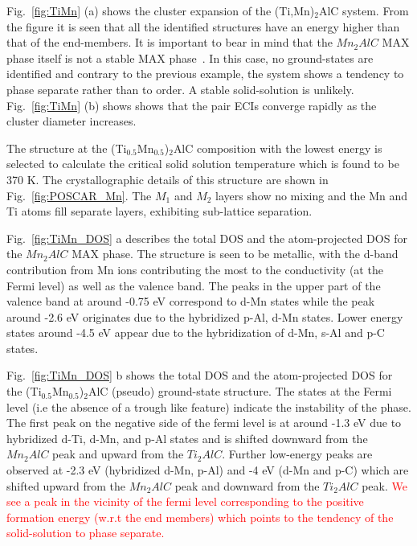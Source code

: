 \documentclass[preprint,amsmath,amssymb,aps, prb,showkeys]{revtex4-1}
\newcommand{\fig}[1]{Fig.~\ref{#1}}
\begin{document}
\fig{fig:TiMn} (a) shows the cluster expansion of the (Ti,Mn)$_2$AlC system. From the figure it is seen that all the identified structures have an energy higher than that of the end-members. It is important to bear in mind that the $Mn_2AlC$ MAX phase itself is not a stable MAX phase~\cite{mockute2013synthesis}. In this case, no ground-states are identified and contrary to the previous example, the system shows a tendency to phase separate rather than to order. A stable solid-solution is unlikely. \fig{fig:TiMn} (b) shows shows that the pair ECIs converge rapidly as the cluster diameter increases. 

The structure at the (Ti$_{0.5}$Mn$_{0.5}$)$_2$AlC composition with the lowest energy is selected to calculate the critical solid solution temperature which is found to be 370 K. The crystallographic details of this structure are shown in \fig{fig:POSCAR_Mn}. The $M_1$ and $M_2$ layers show no mixing and the Mn and Ti atoms fill separate layers, exhibiting sub-lattice separation. 

\fig{fig:TiMn_DOS} a describes the total DOS and the atom-projected  DOS  for the $Mn_2AlC$ MAX phase. The structure is seen to be metallic, with the d-band contribution from Mn ions contributing the most to the conductivity (at the Fermi level) as well as the valence band. The peaks in the upper part of the valence band at around -0.75 eV correspond to d-Mn states while the peak around -2.6 eV originates due to the hybridized p-Al, d-Mn states. Lower energy states around -4.5 eV appear due to the hybridization of d-Mn, s-Al and p-C states. 

\fig{fig:TiMn_DOS} b shows the total DOS and the atom-projected  DOS  for the (Ti$_{0.5}$Mn$_{0.5}$)$_2$AlC (pseudo) ground-state structure. The states at the Fermi level (i.e the absence of a trough like feature) indicate the instability of the phase. The first peak on the negative side of the fermi level is at around -1.3 eV due to hybridized d-Ti, d-Mn, and p-Al states and is shifted downward from the $Mn_2AlC$ peak and upward from the $Ti_2AlC$. Further low-energy peaks are observed at -2.3 eV (hybridized d-Mn, p-Al) and -4 eV (d-Mn and p-C) which are shifted upward from the $Mn_2AlC$ peak and downward from the $Ti_2AlC$ peak. \textcolor{red}{We see a peak in the vicinity of the fermi level corresponding to the positive formation energy (w.r.t the end members) which points to the tendency of the solid-solution to phase separate.} 
\end{document}

